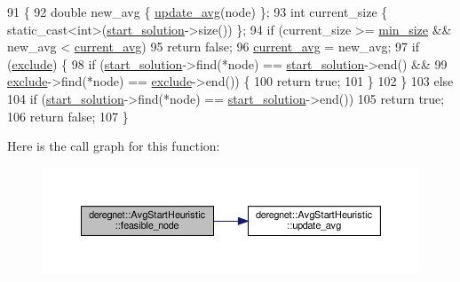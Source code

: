 \begin{DoxyCode}
91                                                 \{
92     \textcolor{keywordtype}{double} new\_avg \{ \hyperlink{classderegnet_1_1AvgStartHeuristic_ab3cbc873952af7525654194a7d5e59e0}{update\_avg}(node) \};
93     \textcolor{keywordtype}{int} current\_size \{ \textcolor{keyword}{static\_cast<}\textcolor{keywordtype}{int}\textcolor{keyword}{>}(\hyperlink{classderegnet_1_1DeregnetStartHeuristic_a7450e11ca0a265b055f95e7832b65e2f}{start\_solution}->size()) \};
94     \textcolor{keywordflow}{if} (current\_size >= \hyperlink{classderegnet_1_1AvgStartHeuristic_a3abc4d801d4eb1fdb8ecfed7077045b3}{min\_size} && new\_avg < \hyperlink{classderegnet_1_1AvgStartHeuristic_a2c4b3fa6aa7946276404e650ea42fd14}{current\_avg})
95         \textcolor{keywordflow}{return} \textcolor{keyword}{false};
96     \hyperlink{classderegnet_1_1AvgStartHeuristic_a2c4b3fa6aa7946276404e650ea42fd14}{current\_avg} = new\_avg;
97     \textcolor{keywordflow}{if} (\hyperlink{classderegnet_1_1DeregnetStartHeuristic_aa22c6581cd404bf7ac325850b28dc951}{exclude}) \{
98         \textcolor{keywordflow}{if} (\hyperlink{classderegnet_1_1DeregnetStartHeuristic_a7450e11ca0a265b055f95e7832b65e2f}{start\_solution}->find(*node) == \hyperlink{classderegnet_1_1DeregnetStartHeuristic_a7450e11ca0a265b055f95e7832b65e2f}{start\_solution}->end() &&
99             \hyperlink{classderegnet_1_1DeregnetStartHeuristic_aa22c6581cd404bf7ac325850b28dc951}{exclude}->find(*node) == \hyperlink{classderegnet_1_1DeregnetStartHeuristic_aa22c6581cd404bf7ac325850b28dc951}{exclude}->end()) \{
100             \textcolor{keywordflow}{return} \textcolor{keyword}{true};
101         \}
102     \}
103     \textcolor{keywordflow}{else}
104         \textcolor{keywordflow}{if} (\hyperlink{classderegnet_1_1DeregnetStartHeuristic_a7450e11ca0a265b055f95e7832b65e2f}{start\_solution}->find(*node) == \hyperlink{classderegnet_1_1DeregnetStartHeuristic_a7450e11ca0a265b055f95e7832b65e2f}{start\_solution}->end())
105             \textcolor{keywordflow}{return} \textcolor{keyword}{true};
106     \textcolor{keywordflow}{return} \textcolor{keyword}{false};
107 \}
\end{DoxyCode}
Here is the call graph for this function\+:\nopagebreak
\begin{figure}[H]
\begin{center}
\leavevmode
\includegraphics[width=350pt]{classderegnet_1_1AvgStartHeuristic_a3e18528bc735d47edcd719a72baf4e46_cgraph}
\end{center}
\end{figure}
